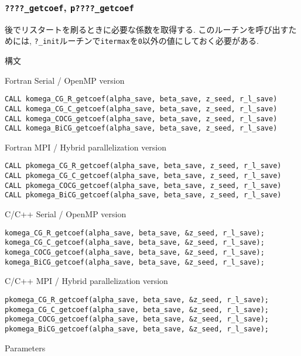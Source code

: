 \documentclass[12pt,titlepage]{article}
\begin{document}
\subsubsection{\texttt{????\_getcoef}, \texttt{p????\_getcoef}}

後でリスタートを刷るときに必要な係数を取得する.
このルーチンを呼び出すためには,
\verb|?_init|ルーチンで\verb|itermax|を\verb|0|以外の値にしておく必要がある.

\noindent 構文

\noindent  Fortran Serial / OpenMP version
\begin{verbatim}
CALL komega_CG_R_getcoef(alpha_save, beta_save, z_seed, r_l_save)
CALL komega_CG_C_getcoef(alpha_save, beta_save, z_seed, r_l_save)
CALL komega_COCG_getcoef(alpha_save, beta_save, z_seed, r_l_save)
CALL komega_BiCG_getcoef(alpha_save, beta_save, z_seed, r_l_save)
\end{verbatim}

\noindent Fortran MPI / Hybrid parallelization version
\begin{verbatim}
CALL pkomega_CG_R_getcoef(alpha_save, beta_save, z_seed, r_l_save)
CALL pkomega_CG_C_getcoef(alpha_save, beta_save, z_seed, r_l_save)
CALL pkomega_COCG_getcoef(alpha_save, beta_save, z_seed, r_l_save)
CALL pkomega_BiCG_getcoef(alpha_save, beta_save, z_seed, r_l_save)
\end{verbatim}

\noindent C/C++ Serial / OpenMP version
\begin{verbatim}
komega_CG_R_getcoef(alpha_save, beta_save, &z_seed, r_l_save);
komega_CG_C_getcoef(alpha_save, beta_save, &z_seed, r_l_save);
komega_COCG_getcoef(alpha_save, beta_save, &z_seed, r_l_save);
komega_BiCG_getcoef(alpha_save, beta_save, &z_seed, r_l_save);
\end{verbatim}

\noindent C/C++ MPI / Hybrid parallelization version
\begin{verbatim}
pkomega_CG_R_getcoef(alpha_save, beta_save, &z_seed, r_l_save);
pkomega_CG_C_getcoef(alpha_save, beta_save, &z_seed, r_l_save);
pkomega_COCG_getcoef(alpha_save, beta_save, &z_seed, r_l_save);
pkomega_BiCG_getcoef(alpha_save, beta_save, &z_seed, r_l_save);
\end{verbatim}

\noindent Parameters
\end{document}
